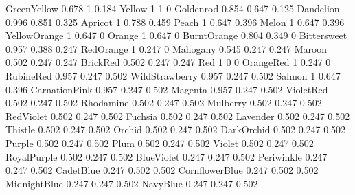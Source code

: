 \newColor GreenYellow {0.678 1 0.184}   %
\newColor Yellow {1 1 0}                %
\newColor Goldenrod {0.854 0.647 0.125}  %
\newColor Dandelion {0.996 0.851 0.325}  %
\newColor Apricot {1 0.788 0.459}       %
\newColor Peach {1 0.647 0.396}         %
\newColor Melon {1 0.647 0.396}         %
\newColor YellowOrange {1 0.647 0}      %
\newColor Orange {1 0.647 0}            %
\newColor BurntOrange {0.804 0.349 0}   %
\newColor Bittersweet {0.957 0.388 0.247} %
\newColor RedOrange {1 0.247 0}         %
\newColor Mahogany {0.545 0.247 0.247}  %
\newColor Maroon {0.502 0.247 0.247}    %
\newColor BrickRed {0.502 0.247 0.247}  %
\newColor Red {1 0 0}                   %
\newColor OrangeRed {1 0.247 0}         %
\newColor RubineRed {0.957 0.247 0.502} %
\newColor WildStrawberry {0.957 0.247 0.502} %
\newColor Salmon {1 0.647 0.396}        %
\newColor CarnationPink {0.957 0.247 0.502} %
\newColor Magenta {0.957 0.247 0.502}   %
\newColor VioletRed {0.502 0.247 0.502} %
\newColor Rhodamine {0.502 0.247 0.502} %
\newColor Mulberry {0.502 0.247 0.502}  %
\newColor RedViolet {0.502 0.247 0.502} %
\newColor Fuchsia {0.502 0.247 0.502}   %
\newColor Lavender {0.502 0.247 0.502}  %
\newColor Thistle {0.502 0.247 0.502}   %
\newColor Orchid {0.502 0.247 0.502}    %
\newColor DarkOrchid {0.502 0.247 0.502} %
\newColor Purple {0.502 0.247 0.502}    %
\newColor Plum {0.502 0.247 0.502}      %
\newColor Violet {0.502 0.247 0.502}     %
\newColor RoyalPurple {0.502 0.247 0.502} %
\newColor BlueViolet {0.247 0.247 0.502} %
\newColor Periwinkle {0.247 0.247 0.502} %
\newColor CadetBlue {0.247 0.502 0.502} %
\newColor CornflowerBlue {0.247 0.502 0.502} %
\newColor MidnightBlue {0.247 0.247 0.502} %
\newColor NavyBlue {0.247 0.247 0.502}  %

